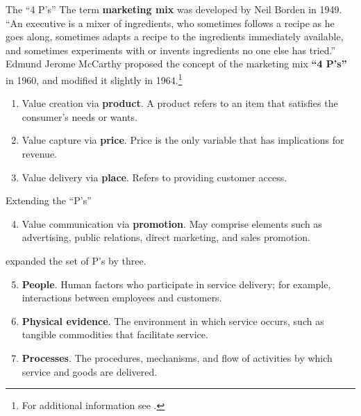 \documentclass[pdf]{beamer}
\newcommand{\empr}[1]{{\color{franklinblue}\textbf{#1}}}
\theoremstyle{remark}
\theoremstyle{definition}
\begin{document}
\begin{frame}[t]{The ``4 P's''}
The term \empr{marketing mix} was developed by Neil Borden in 1949. ``An executive is a mixer of ingredients, who sometimes follows a recipe as he goes along, sometimes adapts a recipe to the ingredients immediately available, and sometimes experiments with or invents ingredients no one else has tried.'' \\
\vspace{1.5ex}
Edmund Jerome McCarthy proposed the concept of the marketing mix \empr{``4 P's''} in 1960, and modified it slightly in 1964.\footnote{For additional information see \cite{mccarthy1964}.} 
\begin{enumerate}
  \item Value creation via \empr{product}. A product refers to an item that satisfies the consumer's needs or wants.
  \item Value capture via \empr{price}.  Price is the only variable that has implications for revenue.
  \item Value delivery via \empr{place}.  Refers to providing customer access. 
\end{enumerate}
\end{frame}

\begin{frame}[t]{Extending the ``P's''}
\begin{enumerate}
  \setcounter{enumi}{3}
  \item Value communication via \empr{promotion}. May comprise elements such as advertising, public relations, direct marketing, and sales promotion.
\end{enumerate}
\cite{booms1981} expanded the set of P's by three. \\
\vspace{1.5ex}
\begin{enumerate}
\setcounter{enumi}{4}
\item \empr{People}.  Human factors who participate in service delivery; for example, interactions between employees and customers.
\item \empr{Physical evidence}. The environment in which service occurs, such as tangible commodities that facilitate service. 
\item \empr{Processes}.   The procedures, mechanisms, and flow of activities by which service and goods are delivered.
\end{enumerate}
\end{frame}
\end{document}
